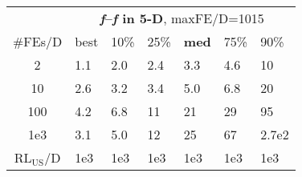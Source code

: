 \begin{tabular}{c|llllll}
 & \multicolumn{6}{|c}{\textbf{\textit{f}\raisebox{-0.35ex}{1}--\textit{f}\raisebox{-0.35ex}{24} in 5-D}, maxFE/D=1015}\\
\#FEs/D & best & 10\% & 25\% & \textbf{med} & 75\% & 90\%\\
2 & \hspace*{1ex}1.1 & \hspace*{1ex}2.0 & \hspace*{1ex}2.4 & \hspace*{1ex}3.3 & \hspace*{1ex}4.6 & 10\\
10 & \hspace*{1ex}2.6 & \hspace*{1ex}3.2 & \hspace*{1ex}3.4 & \hspace*{1ex}5.0 & \hspace*{1ex}6.8 & 20\\
100 & \hspace*{1ex}4.2 & \hspace*{1ex}6.8 & 11 & 21 & 29 & 95\\
1e3 & \hspace*{1ex}3.1 & \hspace*{1ex}5.0 & 12 & 25 & 67 & 2.7e2\\
$\text{RL}_{\text{US}}$/D & 1e3 & 1e3 & 1e3 & 1e3 & 1e3 & 1e3
\end{tabular}
